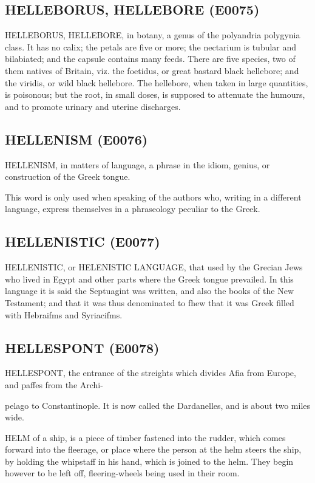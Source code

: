 \documentclass{article}
\begin{document}
\subsection*{HELLEBORUS, HELLEBORE (E0075)}
HELLEBORUS, HELLEBORE, in botany, a genus of the polyandria polygynia class. It has no calix; the petals are five or more; the nectarium is tubular and bilabiated; and the capsule contains many feeds. There are five species, two of them natives of Britain, viz. the foetidus, or great bastard black hellebore; and the viridis, or wild black hellebore. The hellebore, when taken in large quantities, is poisonous; but the root, in small doses, is supposed to attenuate the humours, and to promote urinary and uterine discharges.

\subsection*{HELLENISM (E0076)}
HELLENISM, in matters of language, a phrase in the idiom, genius, or construction of the Greek tongue.

This word is only used when speaking of the authors who, writing in a different language, express themselves in a phraseology peculiar to the Greek.

\subsection*{HELLENISTIC (E0077)}
HELLENISTIC, or HELENISTIC LANGUAGE, that used by the Grecian Jews who lived in Egypt and other parts where the Greek tongue prevailed. In this language it is said the Septuagint was written, and also the books of the New Testament; and that it was thus denominated to fhew that it was Greek filled with Hebraifms and Syriacifms.

\subsection*{HELLESPONT (E0078)}
HELLESPONT, the entrance of the streights which divides Afia from Europe, and paffes from the Archi-

pelago to Constantinople. It is now called the Dardanelles, and is about two miles wide.

HELM of a ship, is a piece of timber fastened into the rudder, which comes forward into the fleerage, or place where the person at the helm steers the ship, by holding the whipstaff in his hand, which is joined to the helm. They begin however to be left off, fleering-wheels being used in their room.
\end{document}
